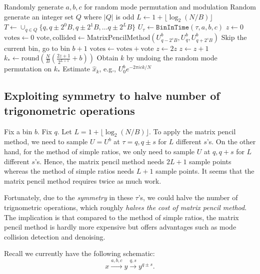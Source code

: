 \documentclass[10pt]{article}
\begin{document}
\begin{algorithmic}[1]
\State Randomly generate $a,b,c$ for random mode permutation and modulation
\State Random generate an integer set $Q$ where $|Q|$ is odd
\State $L \leftarrow 1 + \lfloor \log_2(N/B) \rfloor$
\State $T\leftarrow \cup_{q\in Q} \{q, q \pm 2^0 B, q \pm 2^1 B, \ldots q \pm 2^L B \}$
  \State $U_\tau \leftarrow \texttt{BinInTime}(\tau, a, b, c)$
\EndFor
{}
  \State $z\leftarrow 0$
    \State $\text{votes} \leftarrow 0$
      \State $\text{vote}, \text{collided} \leftarrow \text{MatrixPencilMethod}(U^b_{q-2^s B}, U^b_q, U^b_{q+2^s B})$
      	\State Skip the current bin, go to bin $b+1$
      \EndIf
      \State $\text{votes} \leftarrow \text{votes} + \text{vote}$
    \EndFor
    \State $z \leftarrow 2z$
      \State $z \leftarrow z + 1$
    \EndIf
  \EndFor
  \State $k_* \leftarrow \text{round}( \frac{N}{B}(\frac{2z+1}{2^{L+1}} + b))$
  \State Obtain $k$ by undoing the random mode permutation on $k_*$
  \State Estimate $\hat{x}_k$, e.g., $U^b_0 e^{-2\pi i c k/N}$
\EndFor
\end{algorithmic}

\subsection{Exploiting symmetry to halve number of trigonometric operations}\label{sec:symmetry}

Fix a bin $b$. Fix $q$. Let $L=1+\lfloor \log_2(N/B) \rfloor$. To apply the matrix pencil method, we need to sample $U=U^b$ at $\tau=q, q\pm s$ for $L$ different $s$'s. On the other hand, for the method of simple ratios, we only need to sample $U$ at $q, q+s$ for $L$ different $s$'s. Hence, the matrix pencil method needs $2L+1$ sample points whereas the method of simple ratios needs $L+1$ sample points. It seems that the matrix pencil method requires twice as much work.

Fortunately, due to the \emph{symmetry} in these $\tau$'s, we could halve the number of trignometric operations, which roughly \emph{halves the cost of matrix pencil method}. The implication is that compared to the method of simple ratios, the matrix pencil method is hardly more expensive but offers advantages such as mode collision detection and denoising.

Recall we currently have the following schematic:
$$x \xrightarrow{a,b,c}{y} \xrightarrow{q,s} y^{q\pm s}.$$
\end{document}
